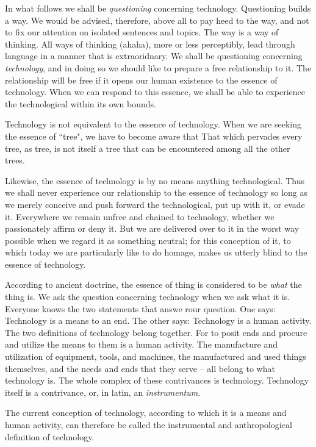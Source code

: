 In what follows we shall be \textit{questioning} concerning technology. Questioning builds a way. We would be advised, therefore, above all to pay heed to the way, and not to fix our attention on isolated sentences and topics. The way is a way of thinking. All ways of thinking (ahaha), more or less perceptibly, lead through language in a manner that is extraoridnary. We shall be questioning concerning \textit{technology}, and in doing so we should like to prepare a free relationship to it. The relationship will be free if it opens our human existence to the essence of technology. When we can respond to this essence, we shall be able to experience the technological within its own bounds.

Technology is not equivalent to the essence of technology. When we are seeking the essence of ``tree", we have to become aware that That which pervades every tree, as tree, is not itself a tree that can be encountered among all the other trees.

Likewise, the essence of technology is by no means anything technological. Thus we shall never experience our relationship to the essence of technology so long as we merely conceive and push forward the technological, put up with it, or evade it. Everywhere we remain unfree and chained to technology, whether we passionately affirm or deny it. But we are delivered over to it in the worst way possible when we regard it as something neutral; for this conception of it, to which today we are particularly like to do homage, makes us utterly blind to the essence of technology.

According to ancient doctrine, the essence of thing is considered to be \textit{what} the thing is. We ask the question concerning technology when we ask what it is. Everyone knows the two statements that answe rour question. One says: Technology is a means to an end. The other says: Technology is a human activity. The two definitions of technology belong together. For to posit ends and procure and utilize the means to them is a human activity. The manufacture and utilization of equipment, tools, and machines, the manufactured and used things themselves, and the needs and ends that they serve -- all belong to what technology is. The whole complex of these contrivances is technology. Technology itself is a contrivance, or, in latin, an \textit{instrumentum}.

The current conception of technology, according to which it is a means and human activity, can therefore be called the instrumental and anthropological definition of technology.

